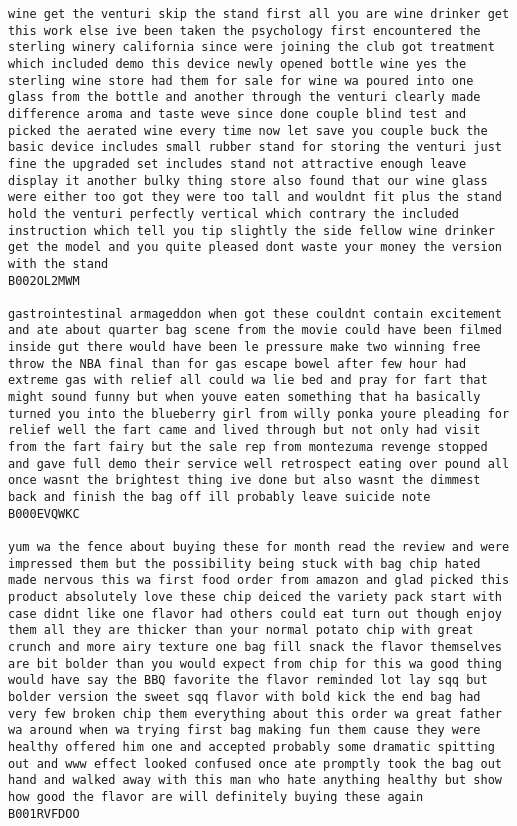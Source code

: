 \documentclass[11pt]{article}
\begin{document}
\begin{Verbatim}[commandchars=\\\{\}]
wine get the venturi skip the stand first all you are wine drinker get this work else ive been taken the psychology first encountered the sterling winery california since were joining the club got treatment which included demo this device newly opened bottle wine yes the sterling wine store had them for sale for wine wa poured into one glass from the bottle and another through the venturi clearly made difference aroma and taste weve since done couple blind test and picked the aerated wine every time now let save you couple buck the basic device includes small rubber stand for storing the venturi just fine the upgraded set includes stand not attractive enough leave display it another bulky thing store also found that our wine glass were either too got they were too tall and wouldnt fit plus the stand hold the venturi perfectly vertical which contrary the included instruction which tell you tip slightly the side fellow wine drinker get the model and you quite pleased dont waste your money the version with the stand
B002OL2MWM

gastrointestinal armageddon when got these couldnt contain excitement and ate about quarter bag scene from the movie could have been filmed inside gut there would have been le pressure make two winning free throw the NBA final than for gas escape bowel after few hour had extreme gas with relief all could wa lie bed and pray for fart that might sound funny but when youve eaten something that ha basically turned you into the blueberry girl from willy ponka youre pleading for relief well the fart came and lived through but not only had visit from the fart fairy but the sale rep from montezuma revenge stopped and gave full demo their service well retrospect eating over pound all once wasnt the brightest thing ive done but also wasnt the dimmest back and finish the bag off ill probably leave suicide note
B000EVQWKC

yum wa the fence about buying these for month read the review and were impressed them but the possibility being stuck with bag chip hated made nervous this wa first food order from amazon and glad picked this product absolutely love these chip deiced the variety pack start with case didnt like one flavor had others could eat turn out though enjoy them all they are thicker than your normal potato chip with great crunch and more airy texture one bag fill snack the flavor themselves are bit bolder than you would expect from chip for this wa good thing would have say the BBQ favorite the flavor reminded lot lay sqq but bolder version the sweet sqq flavor with bold kick the end bag had very few broken chip them everything about this order wa great father wa around when wa trying first bag making fun them cause they were healthy offered him one and accepted probably some dramatic spitting out and www effect looked confused once ate promptly took the bag out hand and walked away with this man who hate anything healthy but show how good the flavor are will definitely buying these again
B001RVFDOO


\end{Verbatim}
\end{document}
